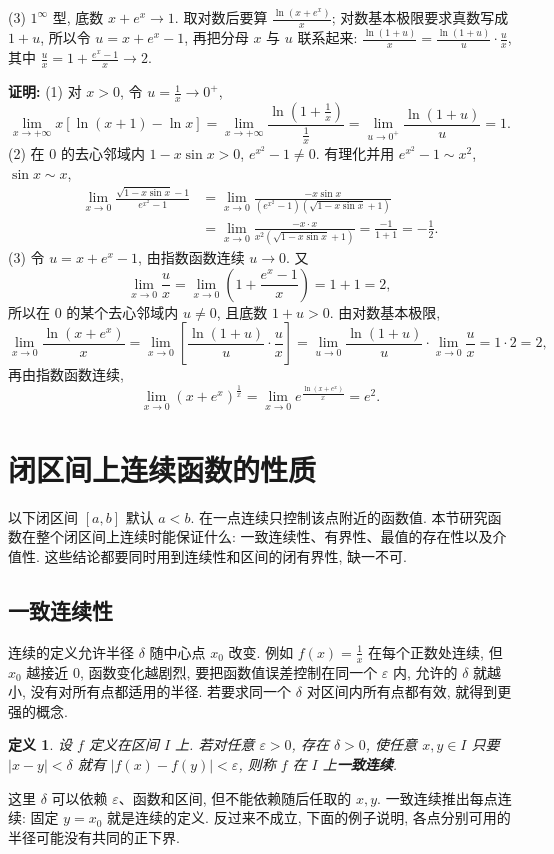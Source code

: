 \documentclass[UTF8,openany]{ctexbook}
\theoremstyle{chinesetextbook}
\newenvironment{cnproof}{\par\indent\textbf{证明:} \ignorespaces}{\par}
\newtheorem*{definitionsingle}{定义}
\begin{document}
(3) $1^\infty$ 型, 底数 $x+e^x\to1$. 取对数后要算 $\displaystyle\frac{\ln(x+e^x)}x$; 对数基本极限要求真数写成 $1+u$, 所以令 $u=x+e^x-1$, 再把分母 $x$ 与 $u$ 联系起来: $\displaystyle\frac{\ln(1+u)}x=\frac{\ln(1+u)}u\cdot\frac ux$, 其中 $\displaystyle\frac ux=1+\frac{e^x-1}x\to2$.
\begin{cnproof}
(1) 对 $x>0$, 令 $\displaystyle u=\frac1x\to0^+$,
\[
\lim_{x\to+\infty}x\left[\ln(x+1)-\ln x\right]
=\lim_{x\to+\infty}\frac{\ln\left(1+\frac1x\right)}{\frac1x}
=\lim_{u\to0^+}\frac{\ln(1+u)}u=1.
\]
(2) 在 $0$ 的去心邻域内 $1-x\sin x>0$, $e^{x^2}-1\ne0$. 有理化并用 $e^{x^2}-1\sim x^2$, $\sin x\sim x$,
\[
\begin{aligned}
\lim_{x\to0}\frac{\sqrt{1-x\sin x}-1}{e^{x^2}-1}
&=\lim_{x\to0}\frac{-x\sin x}{\left(e^{x^2}-1\right)\left(\sqrt{1-x\sin x}+1\right)}\\
&=\lim_{x\to0}\frac{-x\cdot x}{x^2\left(\sqrt{1-x\sin x}+1\right)}
=\frac{-1}{1+1}=-\frac12.
\end{aligned}
\]
(3) 令 $u=x+e^x-1$, 由指数函数连续 $u\to0$. 又
\[
\lim_{x\to0}\frac ux=\lim_{x\to0}\left(1+\frac{e^x-1}x\right)=1+1=2,
\]
所以在 $0$ 的某个去心邻域内 $u\ne0$, 且底数 $1+u>0$. 由对数基本极限,
\[
\lim_{x\to0}\frac{\ln(x+e^x)}x
=\lim_{x\to0}\left[\frac{\ln(1+u)}u\cdot\frac ux\right]
=\lim_{u\to0}\frac{\ln(1+u)}u\cdot\lim_{x\to0}\frac ux=1\cdot2=2,
\]
再由指数函数连续,
\[
\lim_{x\to0}\left(x+e^x\right)^{\frac1x}
=\lim_{x\to0}e^{\frac{\ln(x+e^x)}x}=e^2.
\]
\end{cnproof}

\section{闭区间上连续函数的性质}
以下闭区间 $[a,b]$ 默认 $a<b$. 在一点连续只控制该点附近的函数值. 本节研究函数在整个闭区间上连续时能保证什么: 一致连续性、有界性、最值的存在性以及介值性. 这些结论都要同时用到连续性和区间的闭有界性, 缺一不可.
\subsection{一致连续性}
连续的定义允许半径 $\delta$ 随中心点 $x_0$ 改变. 例如 $\displaystyle f(x)=\frac1x$ 在每个正数处连续, 但 $x_0$ 越接近 $0$, 函数变化越剧烈, 要把函数值误差控制在同一个 $\varepsilon$ 内, 允许的 $\delta$ 就越小, 没有对所有点都适用的半径. 若要求同一个 $\delta$ 对区间内所有点都有效, 就得到更强的概念.
\begin{definitionsingle}
设 $f$ 定义在区间 $I$ 上. 若对任意 $\varepsilon>0$, 存在 $\delta>0$, 使任意 $x,y\in I$ 只要 $|x-y|<\delta$ 就有 $|f(x)-f(y)|<\varepsilon$, 则称 $f$ 在 $I$ 上\textbf{一致连续}.
\end{definitionsingle}
这里 $\delta$ 可以依赖 $\varepsilon$、函数和区间, 但不能依赖随后任取的 $x,y$. 一致连续推出每点连续: 固定 $y=x_0$ 就是连续的定义. 反过来不成立, 下面的例子说明, 各点分别可用的半径可能没有共同的正下界.
\end{document}
